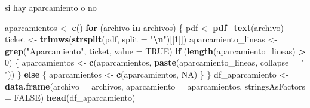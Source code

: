 \documentclass[,,,oneauthor,pdftex]{Definitions/mdpi}
\newenvironment{Shaded}{\begin{snugshade}}{\end{snugshade}}
\newcommand{\AttributeTok}[1]{\textcolor[rgb]{0.13,0.29,0.53}{#1}}
\newcommand{\ConstantTok}[1]{\textcolor[rgb]{0.56,0.35,0.01}{#1}}
\newcommand{\ControlFlowTok}[1]{\textcolor[rgb]{0.13,0.29,0.53}{\textbf{#1}}}
\newcommand{\DecValTok}[1]{\textcolor[rgb]{0.00,0.00,0.81}{#1}}
\newcommand{\FunctionTok}[1]{\textcolor[rgb]{0.13,0.29,0.53}{\textbf{#1}}}
\newcommand{\NormalTok}[1]{#1}
\newcommand{\OtherTok}[1]{\textcolor[rgb]{0.56,0.35,0.01}{#1}}
\newcommand{\SpecialCharTok}[1]{\textcolor[rgb]{0.81,0.36,0.00}{\textbf{#1}}}
\newcommand{\StringTok}[1]{\textcolor[rgb]{0.31,0.60,0.02}{#1}}
\begin{document}
\begin{Shaded}
\end{Shaded}

si hay aparcamiento o no

\begin{Shaded}
\begin{Highlighting}[]
\NormalTok{aparcamientos }\OtherTok{\textless{}{-}} \FunctionTok{c}\NormalTok{()}
\ControlFlowTok{for}\NormalTok{ (archivo }\ControlFlowTok{in}\NormalTok{ archivos) \{}
\NormalTok{  pdf }\OtherTok{\textless{}{-}} \FunctionTok{pdf\_text}\NormalTok{(archivo)}
\NormalTok{  ticket }\OtherTok{\textless{}{-}} \FunctionTok{trimws}\NormalTok{(}\FunctionTok{strsplit}\NormalTok{(pdf, }\AttributeTok{split =} \StringTok{"}\SpecialCharTok{\textbackslash{}n}\StringTok{"}\NormalTok{)[[}\DecValTok{1}\NormalTok{]])}
\NormalTok{  aparcamiento\_lineas }\OtherTok{\textless{}{-}} \FunctionTok{grep}\NormalTok{(}\StringTok{"Aparcamiento"}\NormalTok{, ticket, }\AttributeTok{value =} \ConstantTok{TRUE}\NormalTok{)}
  \ControlFlowTok{if}\NormalTok{ (}\FunctionTok{length}\NormalTok{(aparcamiento\_lineas) }\SpecialCharTok{\textgreater{}} \DecValTok{0}\NormalTok{) \{}
\NormalTok{    aparcamientos }\OtherTok{\textless{}{-}} \FunctionTok{c}\NormalTok{(aparcamientos, }\FunctionTok{paste}\NormalTok{(aparcamiento\_lineas, }\AttributeTok{collapse =} \StringTok{" "}\NormalTok{))}
\NormalTok{  \} }\ControlFlowTok{else}\NormalTok{ \{}
\NormalTok{    aparcamientos }\OtherTok{\textless{}{-}} \FunctionTok{c}\NormalTok{(aparcamientos, }\ConstantTok{NA}\NormalTok{)}
\NormalTok{  \}}
\NormalTok{\}}
\NormalTok{df\_aparcamiento }\OtherTok{\textless{}{-}} \FunctionTok{data.frame}\NormalTok{(}\AttributeTok{archivo =}\NormalTok{ archivos, }\AttributeTok{aparcamiento =}\NormalTok{ aparcamientos, }\AttributeTok{stringsAsFactors =} \ConstantTok{FALSE}\NormalTok{)}
\FunctionTok{head}\NormalTok{(df\_aparcamiento)}
\end{Highlighting}
\end{Shaded}
\end{document}
